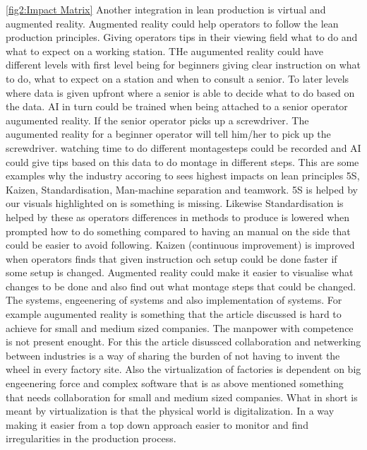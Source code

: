 \documentclass[article,a4paper]{IEEEtran}
\begin{document}
    \ref{fig2:Impact Matrix}
    Another integration in lean production is virtual and augmented reality. Augmented reality could help operators to follow the lean production principles. Giving operators tips in their viewing field what to do and what to expect on a working station. THe augumented reality could have different levels with first level being for beginners giving clear instruction on what to do, what to expect on a station and when to consult a senior. To later levels where data is given upfront where a senior is able to decide what to do based on the data. AI in turn could be trained when being attached to a senior operator augumented reality. If the senior operator picks up a screwdriver. The augumented reality for a beginner operator will tell him/her to pick up the screwdriver. watching time to do different montagesteps could be recorded and AI could give tips based on this data to do montage in different steps. This are some examples why the industry accoring to \cite{Impact_Lean_Prod} sees highest impacts on lean principles 5S, Kaizen, Standardisation, Man-machine separation and teamwork. 
    \newline\newline
    5S is helped by our visuals highlighted on is something is missing. Likewise Standardisation is helped by these as operators differences in methods to produce is lowered when prompted how to do something compared to having an manual on the side that could be easier to avoid following. Kaizen (continuous improvement) is improved  when operators finds that given instruction och setup could be done faster if some setup is changed. Augmented reality could make it easier to visualise what changes to be done and also find out what montage steps that could be changed.  
    \newline\newline
    The systems, engeenering of systems and also implementation of systems. For example augumented reality is something that the article \cite{Change_Man_Landscape} discussed is hard to achieve for small and medium sized companies. The manpower with competence is not present enought. For this the article disussced collaboration and netwerking between industries is a way of sharing the burden of not having to invent the wheel in every factory site. 
\newline\newline
    Also the virtualization of factories is dependent on big engeenering force and complex software that is as above mentioned something that needs collaboration for small and medium sized companies. What in short is meant by virtualization is that the physical world is digitalization. In a way making it easier from a top down approach easier to monitor and find irregularities in the production process. 
\end{document}
